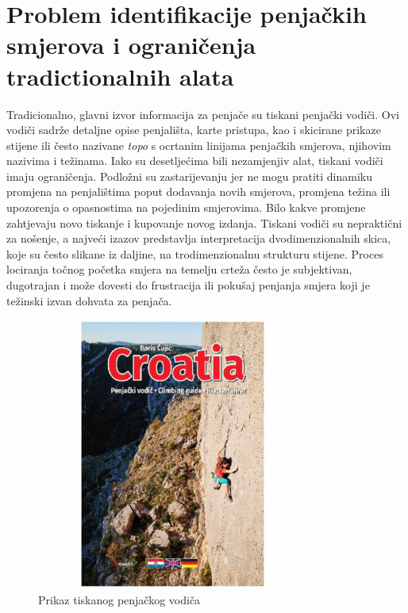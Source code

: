 \section{Problem identifikacije penjačkih smjerova i ograničenja tradictionalnih alata}

Tradicionalno, glavni izvor informacija za penjače su tiskani penjački vodiči. Ovi vodiči sadrže detaljne opise penjališta, karte pristupa, kao i skicirane prikaze stijene ili često nazivane \textit{topo} s ocrtanim linijama penjačkih smjerova, njihovim nazivima i težinama. Iako su desetljećima bili nezamjenjiv alat, tiskani vodiči imaju ograničenja. 
Podložni su zastarijevanju jer ne mogu pratiti dinamiku promjena na penjalištima poput dodavanja novih smjerova, promjena težina ili upozorenja o opasnostima na pojedinim smjerovima. Bilo kakve promjene zahtjevaju novo tiskanje i kupovanje novog izdanja. Tiskani vodiči su nepraktični za nošenje, a najveći izazov predstavlja interpretacija dvodimenzionalnih skica, koje su često slikane iz daljine, na trodimenzionalnu strukturu stijene. Proces lociranja točnog početka smjera na temelju crteža često je subjektivan, dugotrajan i može dovesti do frustracija ili pokušaj penjanja smjera koji je težinski izvan dohvata za penjača. 

\begin{figure}[H]
    \centering
    \includegraphics[width=0.8\textwidth]{images/uvod/tradicionalni_vodic.jpg}
    \caption{Prikaz tiskanog penjačkog vodiča}
\end{figure} 